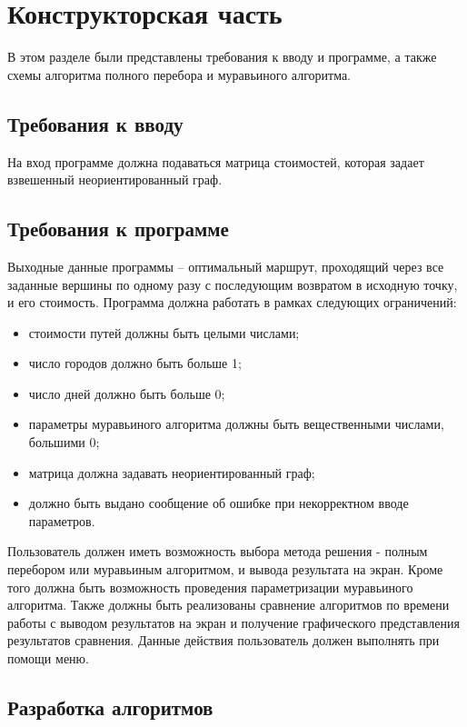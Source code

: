 \chapter{Конструкторская часть}
В этом разделе были представлены требования к вводу и программе, а также схемы алгоритма полного перебора и муравьиного алгоритма.

\section{Требования к вводу}
На вход программе должна подаваться матрица стоимостей, которая задает взвешенный неориентированный граф. 

\section{Требования к программе}
Выходные данные программы -- оптимальный маршрут, проходящий через все заданные вершины по одному разу с последующим возвратом в исходную точку, и его стоимость. Программа должна работать в рамках следующих ограничений: 

\begin{itemize}
 \item стоимости путей должны быть целыми числами;
 \item число городов должно быть больше 1;
 \item число дней должно быть больше 0;
 \item параметры муравьиного алгоритма должны быть вещественными числами, большими 0;
 \item матрица должна задавать неориентированный граф;
 \item должно быть выдано сообщение об ошибке при некорректном вводе параметров.
\end{itemize}

Пользователь должен иметь возможность выбора метода решения - полным перебором или муравьиным алгоритмом, и вывода результата на экран. Кроме того должна быть возможность проведения параметризации муравьиного алгоритма. Также должны быть реализованы сравнение алгоритмов по времени работы с выводом результатов на экран и получение графического представления результатов сравнения. Данные действия пользователь должен выполнять при помощи меню.

\section{Разработка алгоритмов}

